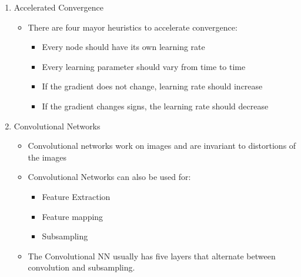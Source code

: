 \documentclass{scrartcl}
\begin{document}
\begin{enumerate}
\item Accelerated Convergence
	\begin{itemize}
	\item There are four mayor heuristics to accelerate convergence:
		\begin{itemize}
		\item Every node should have its own learning rate
		\item Every learning parameter should vary from time to time
		\item If the gradient does not change, learning rate should increase
		\item If the gradient changes signs, the learning rate should decrease
		\end{itemize} 
	\end{itemize}
\item Convolutional Networks
	\begin{itemize}
	\item Convolutional networks work on images and are invariant to distortions of the images
	\item Convolutional Networks can also be used for:
		\begin{itemize}
		\item Feature Extraction
		\item Feature mapping
		\item Subsampling
		\end{itemize}
	\item The Convolutional NN usually has five layers that alternate between convolution and subsampling.
	\end{itemize}
\end{enumerate}
\end{document}
